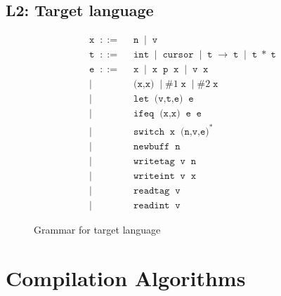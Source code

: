 \documentclass[preprint,10pt,nocopyrightspace,nonatbib]{./bibs/sigplanconf}
\newcommand{\gramdef}{\; ::= \;}
\newcommand{\gramor}{\; | \;}
\newcommand{\keywd}[1]{\; \texttt{#1} \;}
\newcommand{\keywdr}[1]{\; \texttt{#1}^{*} \;}
\begin{document}
\subsection{L2: Target language}

\begin{figure}
\begin{displaymath}
  \begin{aligned}
    \keywd{x} \gramdef & \keywd{n} \gramor \keywd{v} \\
    \keywd{t} \gramdef & \keywd{int} \gramor \keywd{cursor} \gramor \keywd{t} \rightarrow \keywd{t} \gramor \keywd{t} * \keywd{t} \\
    \keywd{e} \gramdef & \keywd{x} \gramor \keywd{x} \keywd{p} \keywd{x} \gramor \keywd{v} \keywd{x} \\
    \gramor & \keywd{(x,x)} \gramor \# 1 \keywd{x} \gramor \# 2 \keywd{x} \\
    \gramor & \keywd{let} \keywd{(v,t,e)} \keywd{e} \\
    \gramor & \keywd{ifeq} \keywd{(x,x)} \keywd{e} \keywd{e} \\
    \gramor & \keywd{switch} \keywd{x} \keywdr{(n,v,e)} \\
    \gramor & \keywd{newbuff} \keywd{n} \\
    \gramor & \keywd{writetag} \keywd{v} \keywd{n} \\
    \gramor & \keywd{writeint} \keywd{v} \keywd{x} \\
    \gramor & \keywd{readtag} \keywd{v} \\
    \gramor & \keywd{readint} \keywd{v} 
  \end{aligned}
\end{displaymath}
\caption{Grammar for target language}
\end{figure}

\section{Compilation Algorithms}

\end{document}
